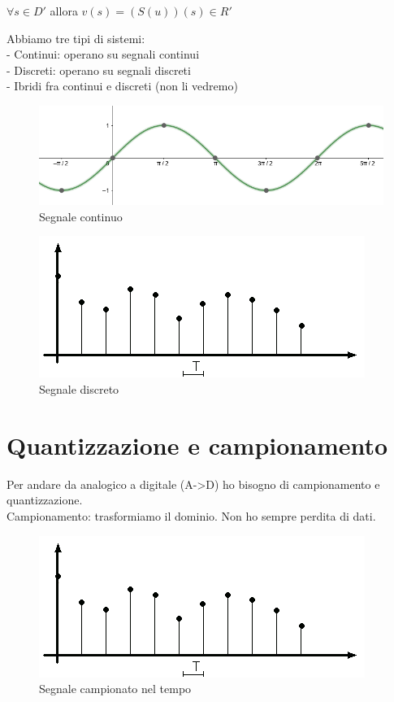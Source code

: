 $ \forall s \in D' $ allora $ v(s)=(S(u))(s)\in R'  $ \\

\pagebreak

Abbiamo tre tipi di sistemi:\\
- Continui: operano su segnali continui\\
- Discreti: operano su segnali discreti\\
- Ibridi fra continui e discreti (non li vedremo)\\

\begin{figure}[h]
	\centering
	\includegraphics[width=0.7\linewidth]{immagini/seno}
	\caption{Segnale continuo}
	\label{fig:seno}
\end{figure}


\begin{figure}[h]
	\centering
	\includegraphics[width=0.7\linewidth]{immagini/tempo_discreto}
	\caption{ Segnale discreto}
	\label{fig:tempodiscreto}
\end{figure}

\section{Quantizzazione e campionamento}
Per andare da analogico a digitale (A->D) ho bisogno di campionamento e quantizzazione.\\

Campionamento: trasformiamo il dominio. Non ho sempre perdita di dati.\\

\begin{figure}[h]
	\centering
	\includegraphics[width=0.7\linewidth]{immagini/tempo_discreto}
	\caption{ Segnale campionato nel tempo}
	\label{fig:tempodiscreto}
\end{figure}

